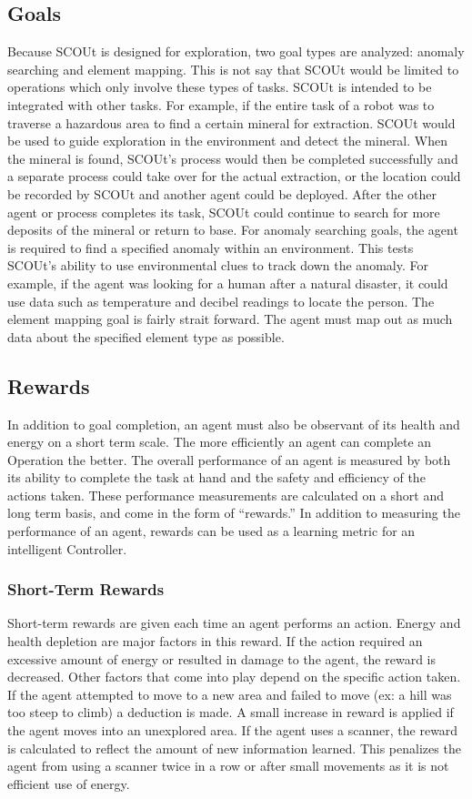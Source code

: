 \subsection{Goals} \label{subsec:goals}
Because SCOUt is designed for exploration, two goal types are analyzed: anomaly searching and element mapping.
This is not say that SCOUt would be limited to operations which only involve these types of tasks.
SCOUt is intended to be integrated with other tasks.
For example, if the entire task of a robot was to traverse a hazardous area to find a certain mineral for extraction.
SCOUt would be used to guide exploration in the environment and detect the mineral.
When the mineral is found, SCOUt's process would then be completed successfully and a separate process could take over for the actual extraction, or the location could be recorded by SCOUt and another agent could be deployed.
After the other agent or process completes its task, SCOUt could continue to search for more deposits of the mineral or return to base.
For anomaly searching goals, the agent is required to find a specified anomaly within an environment.
This tests SCOUt's ability to use environmental clues to track down the anomaly.
For example, if the agent was looking for a human after a natural disaster, it could use data such as temperature and decibel readings to locate the person.
The element mapping goal is fairly strait forward.
The agent must map out as much data about the specified element type as possible.


\subsection{Rewards} \label{subsec:rewards}
In addition to goal completion, an agent must also be observant of its health and energy on a short term scale.
The more efficiently an agent can complete an Operation the better.
The overall performance of an agent is measured by both its ability to complete the task at hand and the safety and efficiency of the actions taken.
These performance measurements are calculated on a short and long term basis, and come in the form of ``rewards.''
In addition to measuring the performance of an agent, rewards can be used as a learning metric for an intelligent Controller.

\subsubsection{Short-Term Rewards}
Short-term rewards are given each time an agent performs an action.
Energy and health depletion are major factors in this reward.
If the action required an excessive amount of energy or resulted in damage to the agent, the reward is decreased.
Other factors that come into play depend on the specific action taken.
If the agent attempted to move to a new area and failed to move (ex: a hill was too steep to climb) a deduction is made.
A small increase in reward is applied if the agent moves into an unexplored area.
If the agent uses a scanner, the reward is calculated to reflect the amount of new information learned.
This penalizes the agent from using a scanner twice in a row or after small movements as it is not efficient use of energy.

